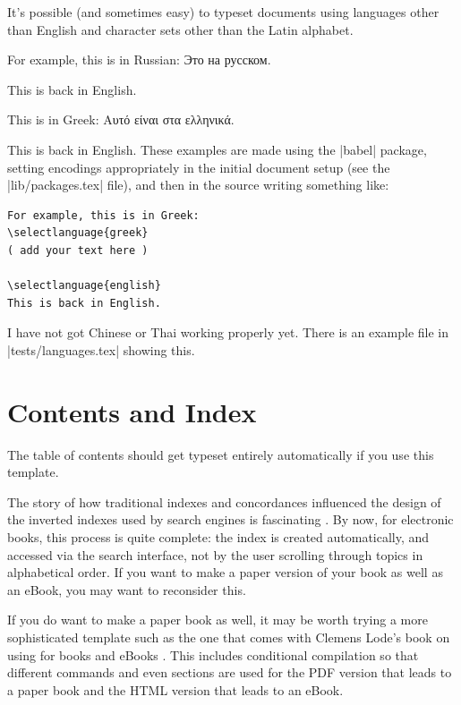 It's possible (and sometimes easy) to typeset documents using languages other than English
and character sets other than the Latin alphabet.

For example, this is in Russian:
Это на русском.

This is back in English.

This is in Greek:
Αυτό είναι στα ελληνικά.

This is back in English. These examples are made using the \sverb|babel| package, setting
encodings appropriately in the initial document setup (see the \sverb|lib/packages.tex| file),
and then in the \latex source writing something like:

\begin{Verbatim}[fontsize=\footnotesize]
For example, this is in Greek:
\selectlanguage{greek}
( add your text here )

\selectlanguage{english}
This is back in English.
\end{Verbatim}

I have not got Chinese or Thai working properly yet. There is an example file in \sverb|tests/languages.tex|
showing this.

\section{Contents and Index}

The table of contents should get typeset entirely automatically if you use this template.

The story of how traditional indexes and concordances influenced the design of the inverted
indexes used by search engines is fascinating \citep[Ch 1]{witten1999gigabytes}.
By now, for electronic books, this process is quite complete: the index is created automatically,
and accessed via the search interface, not by the user scrolling through topics in alphabetical order.
If you want to make a paper
version of your book as well as an eBook, you may want to reconsider this.

If you do want to make a paper book as well, it may be worth trying a
more sophisticated template such as the one that comes with Clemens
Lode's book on using \latex for books and eBooks \citep{lode2019better}.
This includes conditional compilation so that different commands and even sections are used
for the PDF version that leads to a paper book and the HTML version that leads to an eBook.

